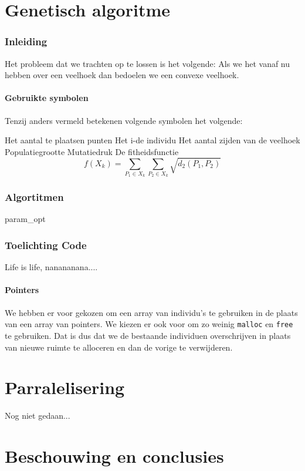 





\part{Genetisch algoritme}
\section{Inleiding}
\label{sec:inleiding}
Het probleem dat we trachten op te lossen is het volgende: %
Als we het vanaf nu hebben over een veelhoek dan bedoelen we een convexe veelhoek.

\subsection{Gebruikte symbolen}
Tenzij anders vermeld betekenen volgende symbolen het volgende:
\begin{itemize}
 Het aantal te plaatsen punten
 Het i-de individu 
 Het aantal zijden van de veelhoek
 Populatiegrootte
 Mutatiedruk 
 De fitheidsfunctie \[f(X_k)= \sum_{P_1 \in X_k}\sum_{P_2 \in X_k} \sqrt{d_2(P_1,P_2)} \]
\end{itemize}


\section{Algortitmen}



 {param_opt}

\section{Toelichting Code}
Life is life, nanananana....
\label{sec:explainationcode}
\subsection{Pointers}
\label{sub:pointer}
We hebben er voor gekozen om een array van individu's te gebruiken in de plaats van een array van pointers. We kiezen er ook voor om zo weinig \texttt{malloc} en \texttt{free} te gebruiken. Dat is dus dat we de bestaande individuen overschrijven in plaats van nieuwe ruimte te alloceren en dan de vorige te verwijderen.

\part{Parralelisering}
Nog niet gedaan...

\part{Beschouwing en conclusies}


